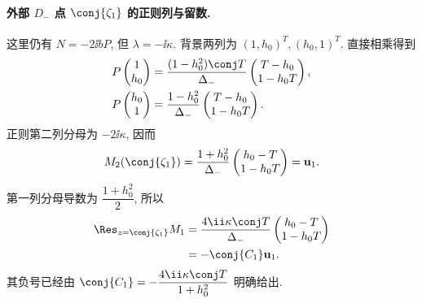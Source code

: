 \paragraph{外部 $D_-$ 点 $\conj{\zeta_1}$ 的正则列与留数.}
这里仍有 $N=-2\ii bP$, 但 $\lambda=-\ii\kappa$.
背景两列为 $(1,h_0)^T,(h_0,1)^T$.
直接相乘得到
\[
\begin{aligned}
P\begin{pmatrix}1\\h_0\end{pmatrix}
&=\dfrac{(1-h_0^2)\conj T}{\Delta_-}
\begin{pmatrix}T-h_0\\1-h_0T\end{pmatrix},\\
P\begin{pmatrix}h_0\\1\end{pmatrix}
&=\dfrac{1-h_0^2}{\Delta_-}
\begin{pmatrix}T-h_0\\1-h_0T\end{pmatrix}.
\end{aligned}
\]
正则第二列分母为 $-2\ii\kappa$, 因而
\[
M_2(\conj{\zeta_1})
=\dfrac{1+h_0^2}{\Delta_-}
\begin{pmatrix}h_0-T\\1-h_0T\end{pmatrix}
=\mathbf u_1.
\]
第一列分母导数为 $\dfrac{1+h_0^2}{2}$, 所以
\[
\begin{aligned}
\Res_{z=\conj{\zeta_1}}M_1
&=\dfrac{4\ii\kappa\conj T}{\Delta_-}
\begin{pmatrix}h_0-T\\1-h_0T\end{pmatrix}\\
&=-\conj{C_1}\mathbf u_1.
\end{aligned}
\]
其负号已经由 $\conj{C_1}=-\dfrac{4\ii\kappa\conj T}{1+h_0^2}$ 明确给出.


